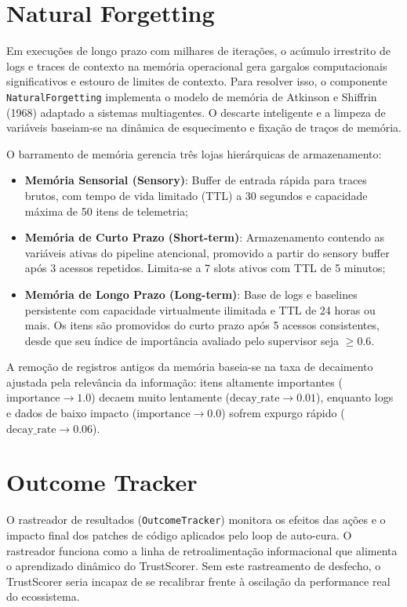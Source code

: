 \documentclass[12pt,a4paper,oneside]{abntex2}
\begin{document}
\section{Natural Forgetting}

Em execuções de longo prazo com milhares de iterações, o acúmulo irrestrito de logs e traces de contexto na memória operacional gera gargalos computacionais significativos e estouro de limites de contexto. Para resolver isso, o componente \texttt{NaturalForgetting} implementa o modelo de memória de Atkinson e Shiffrin (1968) adaptado a sistemas multiagentes. O descarte inteligente e a limpeza de variáveis baseiam-se na dinâmica de esquecimento e fixação de traços de memória.

O barramento de memória gerencia três lojas hierárquicas de armazenamento:

\begin{itemize}
    \item \textbf{Memória Sensorial (Sensory)}: Buffer de entrada rápida para traces brutos, com tempo de vida limitado (TTL) a 30 segundos e capacidade máxima de 50 itens de telemetria;
    \item \textbf{Memória de Curto Prazo (Short-term)}: Armazenamento contendo as variáveis ativas do pipeline atencional, promovido a partir do sensory buffer após 3 acessos repetidos. Limita-se a 7 slots ativos com TTL de 5 minutos;
    \item \textbf{Memória de Longo Prazo (Long-term)}: Base de logs e baselines persistente com capacidade virtualmente ilimitada e TTL de 24 horas ou mais. Os itens são promovidos do curto prazo após 5 acessos consistentes, desde que seu índice de importância avaliado pelo supervisor seja $\geq 0.6$.
\end{itemize}

A remoção de registros antigos da memória baseia-se na taxa de decaimento ajustada pela relevância da informação: itens altamente importantes ($\text{importance} \rightarrow 1.0$) decaem muito lentamente ($\text{decay\_rate} \rightarrow 0.01$), enquanto logs e dados de baixo impacto ($\text{importance} \rightarrow 0.0$) sofrem expurgo rápido ($\text{decay\_rate} \rightarrow 0.06$).

\section{Outcome Tracker}

O rastreador de resultados (\texttt{OutcomeTracker}) monitora os efeitos das ações e o impacto final dos patches de código aplicados pelo loop de auto-cura. O rastreador funciona como a linha de retroalimentação informacional que alimenta o aprendizado dinâmico do TrustScorer. Sem este rastreamento de desfecho, o TrustScorer seria incapaz de se recalibrar frente à oscilação da performance real do ecossistema.
\end{document}
